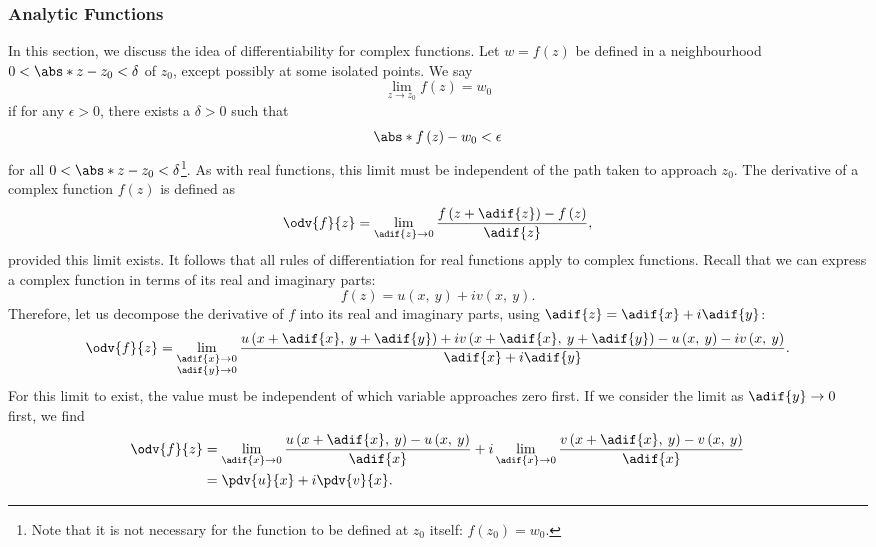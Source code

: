 \documentclass{article}
\begin{document}
\subsubsection{Analytic Functions}
In this section, we discuss the idea of differentiability for complex
functions. Let \(w = f\left( z \right)\) be defined in a neighbourhood
\(0 < \abs*{z - z_0} < \delta\) of \(z_0\), except possibly at some
isolated points. We say
\begin{equation*}
    \lim_{z \to z_0} f\left( z \right) = w_0
\end{equation*}
if for any \(\epsilon > 0\), there exists a \(\delta > 0\) such that
\begin{equation*}
    \abs*{f\left( z \right) - w_0} < \epsilon
\end{equation*}
for all \(0 < \abs*{z - z_0} < \delta\)\footnote{Note that it is not
    necessary for the function to be defined at \(z_0\) itself: \(f\left( z_0 \right)
    = w_0\).}. As with real functions, this limit must be independent of the
path taken to approach \(z_0\). The derivative of a complex function
\(f\left( z \right)\) is defined as
\begin{equation*}
    \odv{f}{z} = \lim_{\adif{z} \to 0} \frac{f\left( z + \adif{z} \right) - f\left( z \right)}{\adif{z}},
\end{equation*}
provided this limit exists. It follows that all rules of differentiation
for real functions apply to complex functions. Recall that we can
express a complex function in terms of its real and imaginary parts:
\begin{equation*}
    f\left( z \right) = u\left( x,\: y \right) + i v\left( x,\: y \right).
\end{equation*}
Therefore, let us decompose the derivative of \(f\) into its real and
imaginary parts, using \(\adif{z} = \adif{x} + i \adif{y}\):
\begin{equation*}
    \odv{f}{z} = \lim_{\substack{\adif{x} \to 0 \\ \adif{y} \to 0}} \frac{u\left( x + \adif{x},\: y + \adif{y} \right) + i v\left( x + \adif{x},\: y + \adif{y} \right) - u\left( x,\: y \right) - i v\left( x,\: y \right)}{\adif{x} + i \adif{y}}.
\end{equation*}
For this limit to exist, the value must be independent of which variable
approaches zero first. If we consider the limit as \(\adif{y} \to 0\)
first, we find
\begin{align*}
    \odv{f}{z} & = \lim_{\adif{x} \to 0} \frac{u\left( x + \adif{x},\: y \right) - u\left( x,\: y \right)}{\adif{x}} + i \lim_{\adif{x} \to 0} \frac{v\left( x + \adif{x},\: y \right) - v\left( x,\: y \right)}{\adif{x}} \\
               & = \pdv{u}{x} + i \pdv{v}{x}.
\end{align*}
\end{document}
